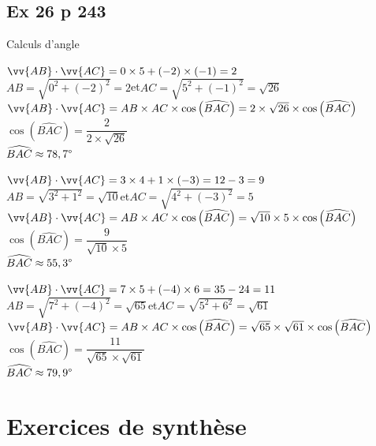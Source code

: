 \documentclass[12pt,a4paper]{book}
\begin{document}
\subsection*{Ex 26 p 243}
Calculs d'angle
\begin{enumMet}
	\item $\vv{A B} \cdot \vv{A C}=0 \times 5+(-2) \times(-1)=2$\\
	$AB=\sqrt{0^2+(-2)^2}=2$\quad  et\quad $AC=\sqrt{5^2+(-1)^2}=\sqrt{26}$\\
	$\vv{AB} \cdot \vv{AC}=AB \times AC \times \cos \left(\widehat{BAC}\right)=2\times\sqrt{26}\times\cos \left(\widehat{BAC}\right)$\\
	$\cos \left(\widehat{BAC}\right)=\dfrac{2}{2\times\sqrt{26}}$\\
	$\widehat{BAC}\approx 78,7\degree$
	\item $\vv{A B} \cdot \vv{A C}=3 \times 4+1 \times(-3)=12-3=9$\\
	$AB=\sqrt{3^2+1^2}=\sqrt{10}$\quad  et\quad $AC=\sqrt{4^2+(-3)^2}=5$\\
	$\vv{AB} \cdot \vv{AC}=AB \times AC \times \cos \left(\widehat{BAC}\right)=\sqrt{10}\times5\times\cos \left(\widehat{BAC}\right)$\\
	$\cos \left(\widehat{BAC}\right)=\dfrac{9}{\sqrt{10}\times5}$\\
	$\widehat{BAC}\approx 55,3\degree$
	\item $\vv{A B} \cdot \vv{A C}=7 \times 5+(-4) \times 6=35-24=11$\\
	$AB=\sqrt{7^2+(-4)^2}=\sqrt{65}$\quad  et\quad $AC=\sqrt{5^2+6^2}=\sqrt{61}$\\
	$\vv{AB} \cdot \vv{AC}=AB \times AC \times \cos \left(\widehat{BAC}\right)=\sqrt{65}\times\sqrt{61}\times\cos \left(\widehat{BAC}\right)$\\
	$\cos \left(\widehat{BAC}\right)=\dfrac{11}{\sqrt{65}\times\sqrt{61}}$\\
	$\widehat{BAC}\approx 79,9 \degree$
\end{enumMet}

\section*{Exercices de synthèse}
\end{document}
